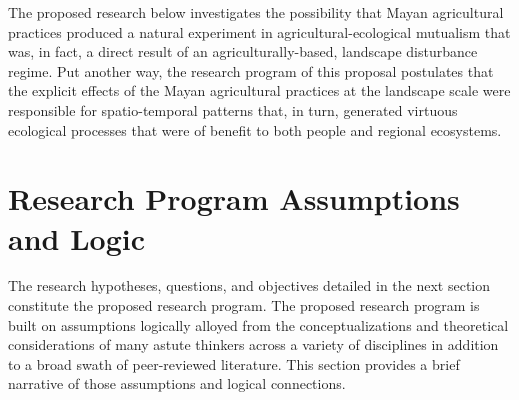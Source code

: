 \documentclass[twoside]{article}	%
\begin{document}
The proposed research below investigates the possibility that Mayan agricultural practices produced a natural experiment in agricultural-ecological mutualism that was, in fact, a direct result of an agriculturally-based, landscape disturbance regime. Put another way, the research program of this proposal postulates that the explicit effects of the Mayan agricultural practices at the landscape scale were responsible for spatio-temporal patterns that, in turn, generated virtuous ecological processes that were of benefit to both people and regional ecosystems.\\ 

\section{Research Program Assumptions and Logic}
The research hypotheses, questions, and objectives detailed in the next section constitute the proposed research program. The proposed research program is built on assumptions logically alloyed from the conceptualizations and theoretical considerations of many astute thinkers across a variety of disciplines in addition to a broad swath of peer-reviewed literature. This section provides a brief narrative of those assumptions and logical connections.\\
\end{document}
